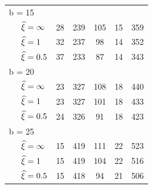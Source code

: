 \begin{tabular}{lccccc}
\multicolumn{6}{l}{ \hspace{3.8 mm} b = 15}  \\  
 
$\hspace{.5cm} \widehat \xi = \infty$ & 28 & 239 & 105 & 15 & 359 \\
$\hspace{.5cm} \widehat \xi = 1$ &   32 & 237 & 98 & 14 & 352 \\
$\hspace{.5cm} \widehat \xi = 0.5$& 37 & 233 & 87 & 14 & 343 \\


\multicolumn{6}{l}{ \hspace{3.8 mm} b = 20}  \\  
 
$\hspace{.5cm} \widehat \xi = \infty$ & 23 & 327 & 108 & 18 & 440 \\
$\hspace{.5cm} \widehat \xi = 1$ &  23 & 327 & 101 & 18 & 433 \\
$\hspace{.5cm} \widehat \xi = 0.5$&  24 & 326 & 91 & 18 & 423 \\

\multicolumn{6}{l}{ \hspace{3.8 mm} b = 25}  \\  
 
$\hspace{.5cm} \widehat \xi = \infty$ & 15 & 419 & 111 & 22 & 523 \\
$\hspace{.5cm} \widehat \xi = 1$ &  15 & 419 & 104 & 22 & 516 \\
$\hspace{.5cm} \widehat \xi = 0.5$& 15 & 418 & 94 & 21 & 506 \\

\bottomrule
\end{tabular}
